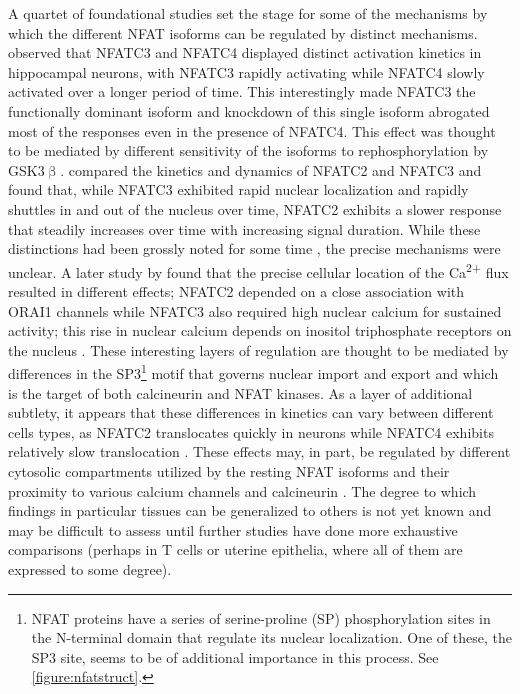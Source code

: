 A quartet of foundational studies set the stage for some of the mechanisms by which the different NFAT isoforms can be regulated by distinct mechanisms. \citet{Ulrich2012} observed that NFATC3 and NFATC4 displayed distinct activation kinetics in hippocampal neurons, with NFATC3 rapidly activating while NFATC4 slowly activated over a longer period of time. This interestingly made NFATC3 the functionally dominant isoform and knockdown of this single isoform abrogated most of the responses even in the presence of NFATC4. This effect was thought to be mediated by different sensitivity of the isoforms to rephosphorylation by GSK3$\upbeta$. \citet{Yissachar2013} compared the kinetics and dynamics of NFATC2 and NFATC3 and found that, while NFATC3 exhibited rapid nuclear localization and rapidly shuttles in and out of the nucleus over time, NFATC2 exhibits a slower response that steadily increases over time with increasing signal duration. While these distinctions had been grossly noted for some time \citep{Chow1997, Rinne2009}, the precise mechanisms were unclear. A later study by \citet{Kar2015} found that the precise cellular location of the Ca\textsuperscript{2+} flux resulted in different effects; NFATC2 depended on a close association with ORAI1 channels while NFATC3 also required high nuclear calcium for sustained activity; this rise in nuclear calcium depends on inositol triphosphate receptors on the nucleus \citep{Kar2016}. These interesting layers of regulation are thought to be mediated by differences in the SP3\footnote{NFAT proteins have a series of serine-proline (SP) phosphorylation sites in the N-terminal domain that regulate its nuclear localization. One of these, the SP3 site, seems to be of additional importance in this process. See \autoref{figure:nfatstruct}.} motif that governs nuclear import and export and which is the target of both calcineurin and NFAT kinases. As a layer of additional subtlety, it appears that these differences in kinetics can vary between different cells types, as NFATC2 translocates quickly in neurons while NFATC4 exhibits relatively slow translocation \citep{Vihma2016}. These effects may, in part, be regulated by different cytosolic compartments utilized by the resting NFAT isoforms and their proximity to various calcium channels and calcineurin \citep{UlenginTalkish2022}. The degree to which findings in particular tissues can be generalized to others is not yet known and may be difficult to assess until further studies have done more exhaustive comparisons (perhaps in T cells or uterine epithelia, where all of them are expressed to some degree). 

